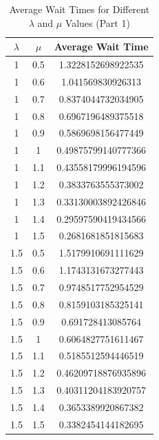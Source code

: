 \documentclass[fleqn, a4paper. 12pt]{jsarticle}
\begin{document}
        \begin{table}[p]
        \centering
        \begin{tabular}{|c|c|c|}
        \hline
        $\lambda$ & $\mu$ & Average Wait Time \\
        \hline
        1 & 0.5 & 1.3228152698922535 \\
        1 & 0.6 & 1.041569830926313 \\
        1 & 0.7 & 0.8374044732034905 \\
        1 & 0.8 & 0.6967196489375518 \\
        1 & 0.9 & 0.5869698156477449 \\
        1 & 1 & 0.49875799140777366 \\
        1 & 1.1 & 0.43558179996194596 \\
        1 & 1.2 & 0.3833763555373002 \\
        1 & 1.3 & 0.33130003892426846 \\
        1 & 1.4 & 0.29597590419434566 \\
        1 & 1.5 & 0.2681681851815683 \\
        1.5 & 0.5 & 1.5179910691111629 \\
        1.5 & 0.6 & 1.1743131673277443 \\
        1.5 & 0.7 & 0.9748517752954529 \\
        1.5 & 0.8 & 0.8159103185325141 \\
        1.5 & 0.9 & 0.691728413085764 \\
        1.5 & 1 & 0.6064827751611467 \\
        1.5 & 1.1 & 0.5185512594446519 \\
        1.5 & 1.2 & 0.46209718876935896 \\
        1.5 & 1.3 & 0.40311204183920757 \\
        1.5 & 1.4 & 0.3653389920867382 \\
        1.5 & 1.5 & 0.3382454144182695 \\
        \hline
        \end{tabular}
        \caption{Average Wait Times for Different $\lambda$ and $\mu$ Values (Part 1)}
        \label{table:2}
        \end{table}
\end{document}
